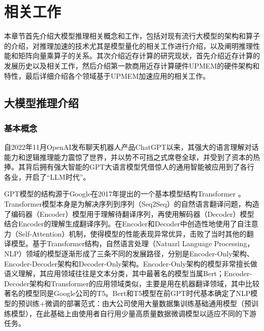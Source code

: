 \chapter{相关工作}

本章节首先介绍大模型推理相关概念和工作，包括对现有流行大模型的架构和算子的介绍，对推理加速的技术尤其是模型量化的相关工作进行介绍，以及阐明推理性能和矩阵向量乘算子的关系。其次介绍近存计算的研究现状，首先介绍近存计算的发展历史以及相关工作，然后介绍第一款商用近存计算硬件UPMEM的硬件架构和特性，最后详细介绍各个领域基于UPMEM加速应用的相关工作。

\section{大模型推理介绍}

\subsection{基本概念}
自2022年11月OpenAI发布聊天机器人产品ChatGPT以来，其强大的语言理解对话能力和逻辑推理能力震惊了世界，并以势不可挡之式席卷全球，并受到了资本的热捧。其背后拥有强大智能的GPT大语言模型凭借惊人的通用智能被应用到了各行各业，开启了“LLM时代”。

GPT模型的结构源于Google在2017年提出的一个基本模型结构Transformer \cite{Transformer}。Transformer模型本身是为解决序列到序列（Seq2Seq）的自然语言翻译问题，构造了编码器（Encoder）模型用于理解待翻译序列，再使用解码器（Decoder）模型结合Encoder的理解生成翻译序列。在Encoder和Decoder中创造性地使用了自注意力（Self-Attention）机制，使得模型的性能表现异常优异，击败了当时其他的翻译模型。基于Transformer结构，自然语言处理（Natuarl Language Processing，NLP）领域的模型逐渐形成了三条不同的发展路径，分别是Encoder-Only架构、Encoder-Decoder架构和Decoder-Only架构。Encoder-Only架构的模型非常擅长做语义理解，其应用领域往往是文本分类，其中最著名的模型当属Bert\cite{Bert}；Encoder-Decoder架构和Transformer的应用领域类似，主要是用在机器翻译领域，其中比较著名的模型同是Google公司的T5\cite{T5}。Bert和T5模型在前GPT时代基本确定了NLP模型的预训练+微调的部署范式：由大公司使用大量数据集训练基础通用模型（预训练模型），在此基础上由使用者自行用少量高质量数据微调模型以适应不同的下游任务。

